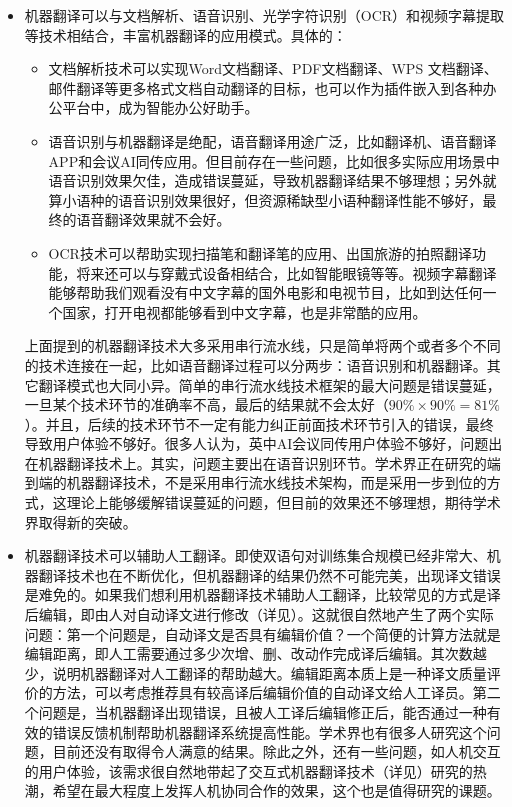 \begin{spacing}{1.18}
\begin{itemize}
\item 机器翻译可以与文档解析、语音识别、光学字符识别（OCR）和视频字幕提取等技术相结合，丰富机器翻译的应用模式。具体的：
\begin{itemize}
\item 文档解析技术可以实现Word文档翻译、PDF文档翻译、WPS 文档翻译、邮件翻译等更多格式文档自动翻译的目标，也可以作为插件嵌入到各种办公平台中，成为智能办公好助手。

\item 语音识别与机器翻译是绝配，语音翻译用途广泛，比如翻译机、语音翻译APP和会议AI同传应用。但目前存在一些问题，比如很多实际应用场景中语音识别效果欠佳，造成错误蔓延，导致机器翻译结果不够理想；另外就算小语种的语音识别效果很好，但资源稀缺型小语种翻译性能不够好，最终的语音翻译效果就不会好。

\item OCR技术可以帮助实现扫描笔和翻译笔的应用、出国旅游的拍照翻译功能，将来还可以与穿戴式设备相结合，比如智能眼镜等等。视频字幕翻译能够帮助我们观看没有中文字幕的国外电影和电视节目，比如到达任何一个国家，打开电视都能够看到中文字幕，也是非常酷的应用。
\end{itemize}
上面提到的机器翻译技术大多采用串行流水线，只是简单将两个或者多个不同的技术连接在一起，比如语音翻译过程可以分两步：语音识别和机器翻译。其它翻译模式也大同小异。简单的串行流水线技术框架的最大问题是错误蔓延，一旦某个技术环节的准确率不高，最后的结果就不会太好（$90\% \times 90\%=81\% $）。并且，后续的技术环节不一定有能力纠正前面技术环节引入的错误，最终导致用户体验不够好。很多人认为，英中AI会议同传用户体验不够好，问题出在机器翻译技术上。其实，问题主要出在语音识别环节。学术界正在研究的端到端的机器翻译技术，不是采用串行流水线技术架构，而是采用一步到位的方式，这理论上能够缓解错误蔓延的问题，但目前的效果还不够理想，期待学术界取得新的突破。

\item 机器翻译技术可以辅助人工翻译。即使双语句对训练集合规模已经非常大、机器翻译技术也在不断优化，但机器翻译的结果仍然不可能完美，出现译文错误是难免的。如果我们想利用机器翻译技术辅助人工翻译，比较常见的方式是译后编辑，即由人对自动译文进行修改（详见{\chapterfour}）。这就很自然地产生了两个实际问题：第一个问题是，自动译文是否具有编辑价值？一个简便的计算方法就是编辑距离，即人工需要通过多少次增、删、改动作完成译后编辑。其次数越少，说明机器翻译对人工翻译的帮助越大。编辑距离本质上是一种译文质量评价的方法，可以考虑推荐具有较高译后编辑价值的自动译文给人工译员。第二个问题是，当机器翻译出现错误，且被人工译后编辑修正后，能否通过一种有效的错误反馈机制帮助机器翻译系统提高性能。学术界也有很多人研究这个问题，目前还没有取得令人满意的结果。除此之外，还有一些问题，如人机交互的用户体验，该需求很自然地带起了交互式机器翻译技术（详见{\chaptereighteen}）研究的热潮，希望在最大程度上发挥人机协同合作的效果，这个也是值得研究的课题。
\end{itemize}


\end{spacing}
